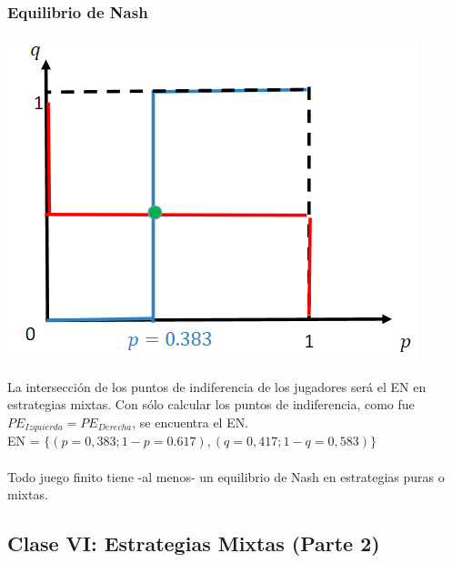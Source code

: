 \documentclass{article}
\begin{document}
            \subsubsection*{Equilibrio de Nash}
                \begin{center}
                    \includegraphics[width=0.5 \linewidth]{figs/mixtas.png}
                \end{center}
                La intersección de los puntos de indiferencia de los jugadores será el EN en estrategias mixtas. Con sólo calcular los puntos de indiferencia, como fue \(PE_{Izquierda} = PE_{Derecha}\), se encuentra el EN. \\
                EN = \(\{(p = 0,383;1-p = 0.617), (q = 0,417; 1-q = 0,583)\}\) \\
                \\
                Todo juego finito tiene -al menos- un equilibrio de Nash en estrategias puras o mixtas.
        \subsection*{Clase VI: Estrategias Mixtas (Parte 2)}
\end{document}
